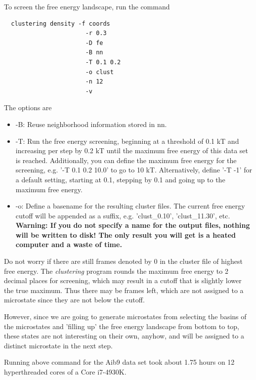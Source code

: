 \documentclass[12pt,a4paper,twoside,english,fleqn]{article}
\begin{document}
To screen the free energy landscape, run the command
\begin{lstlisting}
  clustering density -f coords
                       -r 0.3
                       -D fe
                       -B nn
                       -T 0.1 0.2
                       -o clust
                       -n 12
                       -v
\end{lstlisting}
The options are
\begin{itemize}
  \item -B: Reuse neighborhood information stored in nn.
  \item -T: Run the free energy screening, beginning at a threshold of 0.1 kT
            and increasing per step by 0.2 kT until the maximum free energy
            of this data set is reached.
            Additionally, you can define the maximum free energy for the
            screening, e.g. '-T 0.1 0.2 10.0' to go to 10 kT.
            Alternatively, define '-T -1' for a default setting, starting at
            0.1, stepping by 0.1 and going up to the maximum free energy.
  \item -o: Define a basename for the resulting cluster files. The current free
            energy cutoff will be appended as a suffix, e.g. 'clust\_0.10',
            'clust\_11.30', etc. \textbf{Warning: If you do not specify a name
            for the output files, nothing will be written to disk! The only
            result you will get is a heated computer and a waste of time.}
\end{itemize}

Do not worry if there are still frames denoted by 0 in the cluster file of
highest free energy. The \emph{clustering} program rounds the maximum free
energy to 2 decimal places for screening, which may result in a cutoff that is
slightly lower the true maximum. Thus there may be frames left, which are not
assigned to a microstate since they are not below the cutoff.

However, since we are going to generate microstates from selecting the basins
of the microstates and 'filling up' the free energy landscape from bottom to
top, these states are not interesting on their own, anyhow, and will be
assigned to a distinct microstate in the next step.

\begin{mdframed}[innertopmargin=20pt]
  Running above command for the Aib9 data set took about 1.75 hours on
  12 hyperthreaded cores of a Core i7-4930K.
\end{mdframed}
\end{document}
